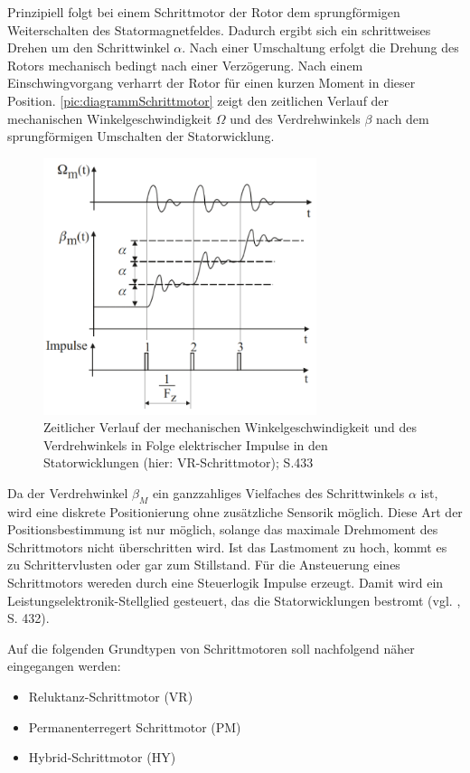 Prinzipiell folgt bei einem Schrittmotor der Rotor dem sprungförmigen Weiterschalten des Statormagnetfeldes. Dadurch ergibt sich ein schrittweises Drehen um den Schrittwinkel $\alpha$. Nach einer Umschaltung erfolgt die Drehung des Rotors mechanisch bedingt nach einer Verzögerung. Nach einem Einschwingvorgang verharrt der Rotor für einen kurzen Moment in dieser Position.  \autoref{pic:diagrammSchrittmotor} zeigt den zeitlichen Verlauf der mechanischen Winkelgeschwindigkeit  $\Omega$ und des Verdrehwinkels $\beta$ nach dem sprungförmigen Umschalten der Statorwicklung.  

 
\begin{figure}[h]
	\begin{center}
		\includegraphics[width=8cm]{DiagrammVerlaufSchrittmotor.png}
		\caption{Zeitlicher Verlauf der mechanischen Winkelgeschwindigkeit und des Verdrehwinkels in Folge elektrischer Impulse in den Statorwicklungen (hier: VR-Schrittmotor); \cite{kleinantriebe} S.433}
		\label{pic:diagrammSchrittmotor}
	\end{center}
\end{figure}


Da der Verdrehwinkel $\beta_M$ ein ganzzahliges Vielfaches des Schrittwinkels $\alpha$ ist, wird eine diskrete Positionierung ohne zusätzliche Sensorik möglich. Diese Art der Positionsbestimmung ist nur möglich, solange das maximale Drehmoment des Schrittmotors nicht überschritten wird. Ist das Lastmoment zu hoch, kommt es zu Schrittervlusten oder gar zum Stillstand.   Für die Ansteuerung eines Schrittmotors wereden durch eine Steuerlogik Impulse erzeugt. Damit wird ein Leistungselektronik-Stellglied gesteuert, das die Statorwicklungen bestromt (vgl. \cite{kleinantriebe}, S. 432). \newline

Auf die folgenden Grundtypen von Schrittmotoren soll nachfolgend näher eingegangen werden:
\begin{itemize}
	\item Reluktanz-Schrittmotor (VR)
	\item Permanenterregert Schrittmotor (PM)
	\item Hybrid-Schrittmotor (HY)
\end{itemize}

